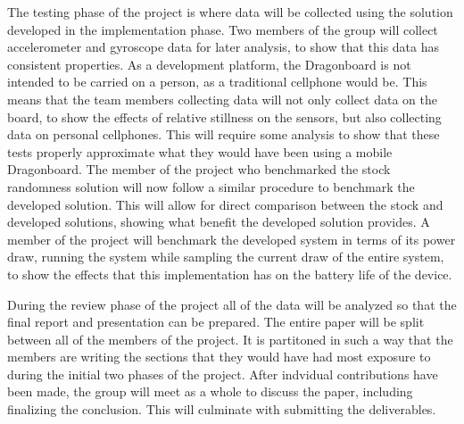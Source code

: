 The testing phase of the project is where data will be collected using the
solution developed in the implementation phase. Two members of the group will
collect accelerometer and gyroscope data for later analysis, to show that this
data has consistent properties. As a development platform, the Dragonboard is
not intended to be carried on a person, as a traditional cellphone would be.
This means that the team members collecting data will not only collect data on
the board, to show the effects of relative stillness on the sensors, but also
collecting data on personal cellphones. This will require some analysis to show
that these tests properly approximate what they would have been using a mobile
Dragonboard. The member of the project who benchmarked the stock randomness
solution will now follow a similar procedure to benchmark the developed
solution. This will allow for direct comparison between the stock and developed
solutions, showing what benefit the developed solution provides. A member of the
project will benchmark the developed system in terms of its power draw, running
the system while sampling the current draw of the entire system, to show the
effects that this implementation has on the battery life of the device.

During the review phase of the project all of the data will be analyzed so that
the final report and presentation can be prepared. The entire paper will be
split between all of the members of the project. It is partitoned in such a way
that the members are writing the sections that they would have had most exposure
to during the initial two phases of the project. After indvidual contributions
have been made, the group will meet as a whole to discuss the paper, including
finalizing the conclusion. This will culminate with submitting the deliverables.

